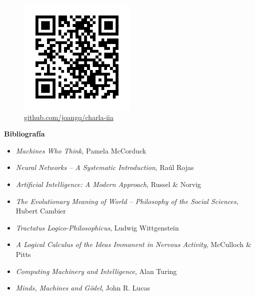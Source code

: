 \documentclass{beamer}
\begin{document}
\begin{frame}{\faGithub{}}
    \begin{figure}[h!]
    \centering
    \includegraphics[width=0.5\textwidth]{qr.png}
    \vspace{-5mm}
    \captionsetup{labelformat=empty}
    \caption{\href{https://www.github.com/joangq/charla-iia}{github.com/joangq/charla-iia}}
\end{figure}

\end{frame}

\begin{frame}{\textbf{Bibliografía}}
    \begin{itemize}
        \item[\filledstar]\textit{Machines Who Think}, Pamela McCorduck
        \item[\filledstar]\textit{Neural Networks -- A Systematic Introduction}, Raúl Rojas
        \item[\filledstar]\textit{Artificial Intelligence: A Modern Approach}, Russel \& Norvig
        \item \textit{The Evolutionary Meaning of World -- Philosophy of the Social Sciences}, Hubert Cambier
        \item \textit{Tractatus Logico-Philosophicus}, Ludwig Wittgenstein
        \item \textit{A Logical Calculus of the Ideas Immanent in Nervous Activity}, McCulloch \& Pitts 
        \item \textit{Computing Machinery and Intelligence}, Alan Turing
        \item \textit{Minds, Machines and Gödel}, John R. Lucas
    \end{itemize}
\end{frame}
\end{document}
